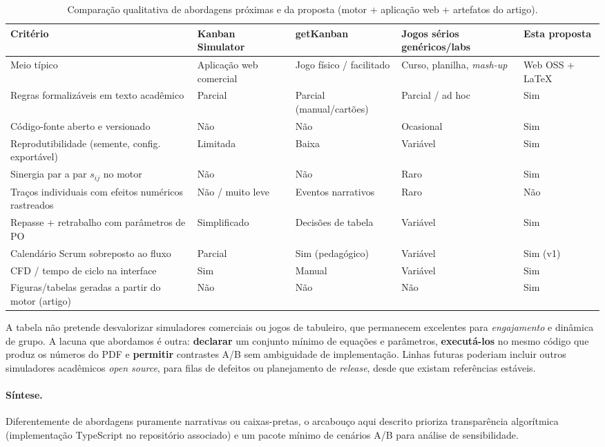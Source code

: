 \begin{table}[htbp]
  \centering
  \caption{Comparação qualitativa de abordagens próximas e da proposta (motor + aplicação web + artefatos do artigo).}
  \label{tab:comparacaoSoftware}
  \small
  \setlength{\tabcolsep}{3pt}
  \begin{tabular}{@{}>{\raggedright\arraybackslash}p{3.15cm}>{\centering\arraybackslash}p{2.35cm}>{\centering\arraybackslash}p{2.35cm}>{\centering\arraybackslash}p{2.35cm}>{\centering\arraybackslash}p{2.85cm}@{}}
    \toprule
    Critério & Kanban Simulator\newline\cite{kanbanSimulator} & getKanban\newline\cite{getkanban} & Jogos sérios genéricos\newline/labs & Esta proposta \\
    \midrule
    Meio típico & Aplicação web comercial & Jogo físico / facilitado & Curso, planilha, \emph{mash-up} & Web OSS + \LaTeX{} \\
    Regras formalizáveis em texto acadêmico & Parcial & Parcial (manual/cartões) & Parcial / ad hoc & Sim \\
    Código-fonte aberto e versionado & Não & Não & Ocasional & Sim \\
    Reprodutibilidade (semente, config. exportável) & Limitada & Baixa & Variável & Sim \\
    Sinergia par a par $s_{ij}$ no motor & Não & Não & Raro & Sim \\
    Traços individuais com efeitos numéricos rastreados & Não / muito leve & Eventos narrativos & Raro & Não \\
    Repasse + retrabalho com parâmetros de PO & Simplificado & Decisões de tabela & Variável & Sim \\
    Calendário Scrum sobreposto ao fluxo & Parcial & Sim (pedagógico) & Variável & Sim (v1) \\
    CFD / tempo de ciclo na interface & Sim & Manual & Variável & Sim \\
    Figuras/tabelas geradas a partir do motor (artigo) & Não & Não & Não & Sim \\
    \bottomrule
  \end{tabular}
\end{table}

A tabela não pretende desvalorizar simuladores comerciais ou jogos de tabuleiro, que permanecem excelentes para \emph{engajamento} e dinâmica de grupo. A lacuna que abordamos é outra: \textbf{declarar} um conjunto mínimo de equações e parâmetros, \textbf{executá-los} no mesmo código que produz os números do PDF e \textbf{permitir} contrastes A/B sem ambiguidade de implementação. Linhas futuras poderiam incluir outros simuladores acadêmicos \emph{open source}, para filas de defeitos ou planejamento de \emph{release}, desde que existam referências estáveis.

\paragraph{Síntese.}
Diferentemente de abordagens puramente narrativas ou caixas-pretas, o arcabouço aqui descrito prioriza transparência algorítmica (implementação TypeScript no repositório associado) e um pacote mínimo de cenários A/B para análise de sensibilidade.
